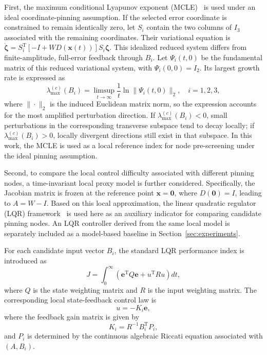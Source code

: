 \documentclass[a4paper,fleqn]{cas-sc}
\theoremstyle{plain}
\theoremstyle{definition}
\begin{document}
First, the maximum conditional Lyapunov exponent (MCLE)~\cite{pecora1998master} is used under an ideal coordinate-pinning assumption. If the selected error coordinate is constrained to remain identically zero, let $S_i$ contain the two columns of $I_3$ associated with the remaining coordinates. Their variational equation is $\dot{\boldsymbol\zeta}=S_i^{\mathrm T}[-I+WD(\mathbf x(t))]S_i\boldsymbol\zeta$. This idealized reduced system differs from finite-amplitude, full-error feedback through $B_i$. Let $\Psi_i(t,0)$ be the fundamental matrix of this reduced variational system, with $\Psi_i(0,0)=I_2$. Its largest growth rate is expressed as
\begin{equation}
	\lambda_{\max}^{(c)}(B_i)
	=
	\limsup_{t\to\infty}
	\frac{1}{t}
	\ln
	\|\Psi_i(t,0)\|_2,
	\quad i=1,2,3,
	\label{eq:mcle}
\end{equation}
where $\|\cdot\|_2$ is the induced Euclidean matrix norm, so the expression accounts for the most amplified perturbation direction. If $\lambda_{\max}^{(c)}(B_i)<0$, small perturbations in the corresponding transverse subspace tend to decay locally; if $\lambda_{\max}^{(c)}(B_i)>0$, locally divergent directions still exist in that subspace. In this work, the MCLE is used as a local reference index for node pre-screening under the ideal pinning assumption.

Second, to compare the local control difficulty associated with different pinning nodes, a time-invariant local proxy model is further considered. Specifically, the Jacobian matrix is frozen at the reference point $\mathbf{x}=\mathbf{0}$, where $D(\mathbf{0})=I$, leading to $A=W-I$. Based on this local approximation, the linear quadratic regulator (LQR) framework~\cite{willems2003least} is used here as an auxiliary indicator for comparing candidate pinning nodes. An LQR controller derived from the same local model is separately included as a model-based baseline in Section~\ref{sec:experiments}.

For each candidate input vector $B_i$, the standard LQR performance index is introduced as
\begin{equation}
	J
	=
	\int_{0}^{\infty}
	\left(
	\mathbf{e}^{\mathrm T}Q\mathbf{e}
	+
	u^{\mathrm T}Ru
	\right)dt,
	\label{eq:lqr_cost}
\end{equation}
where $Q$ is the state weighting matrix and $R$ is the input weighting matrix. The corresponding local state-feedback control law is
\begin{equation}
	u=-K_i\mathbf{e},
	\label{eq:lqr_control}
\end{equation}
where the feedback gain matrix is given by
\begin{equation}
	K_i=R^{-1}B_i^{\mathrm T}P_i,
	\label{eq:lqr_gain}
\end{equation}
and $P_i$ is determined by the continuous algebraic Riccati equation associated with $(A,B_i)$.
\end{document}
